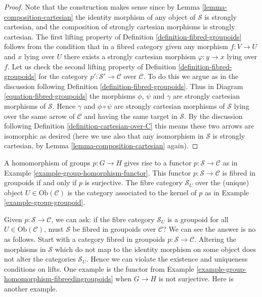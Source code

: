 \begin{proof}
Note that the construction makes sense since by
Lemma \ref{lemma-composition-cartesian}
the identity morphism of any object of $\mathcal{S}$ is strongly cartesian,
and the composition of strongly cartesian morphisms is strongly cartesian.
The first lifting property of
Definition \ref{definition-fibred-groupoids}
follows from the condition that in a fibred category
given any morphism $f : V \to U$ and $x$ lying over $U$ there exists
a strongly cartesian morphism $\varphi : y \to x$ lying over $f$.
Let us check the second lifting property of
Definition \ref{definition-fibred-groupoids}
for the category $p' : \mathcal{S}' \to \mathcal{C}$ over $\mathcal{C}$.
To do this we argue as in the discussion following
Definition \ref{definition-fibred-groupoids}.
Thus in Diagram \ref{equation-fibred-groupoids} the
morphisms $\phi$, $\psi$ and $\gamma$ are strongly cartesian morphisms
of $\mathcal{S}$.
Hence $\gamma$ and $\phi \circ \psi$ are strongly cartesian morphisms
of $\mathcal{S}$ lying over the same arrow of $\mathcal{C}$ and
having the same target in $\mathcal{S}$. By the discussion following
Definition \ref{definition-cartesian-over-C}
this means these two arrows are isomorphic as desired (here we use also
that any isomorphism in $\mathcal{S}$ is strongly cartesian, by
Lemma \ref{lemma-composition-cartesian} again).
\end{proof}

\begin{example}
\label{example-group-homomorphism-fibreedingroupoids}
A homomorphism of groups $p : G \to H$ gives rise to a functor
$p : \mathcal{S}\to\mathcal{C}$ as in Example
\ref{example-group-homorphism-functor}. This functor
$p : \mathcal{S}\to\mathcal{C}$ is fibred in groupoids if and only if
$p$ is surjective.  The fibre category $\mathcal{S}_{U}$ over the (unique)
object $U\in \text{Ob}(\mathcal{C})$ is the category associated to the
kernel of $p$ as in Example \ref{example-group-groupoid}.
\end{example}

\noindent
Given $p : \mathcal{S} \to \mathcal{C}$, we can ask: if the fibre
category $\mathcal{S}_U$ is a groupoid for all $U \in \text{Ob}(\mathcal{C})$,
must $\mathcal{S}$ be fibred in groupoids over $\mathcal{C}$? We can see the
answer is no as follows. Start with a category fibred in groupoids
$p : \mathcal{S} \to \mathcal{C}$. Altering the morphisms in $\mathcal{S}$
which do not map to the identity morphism on some object does not alter the
categories $\mathcal{S}_U$. Hence we can violate the existence and uniqueness
conditions on lifts. One example is the functor from Example
\ref{example-group-homomorphism-fibreedingroupoids} when $G \to H$ is not
surjective. Here is another example.


